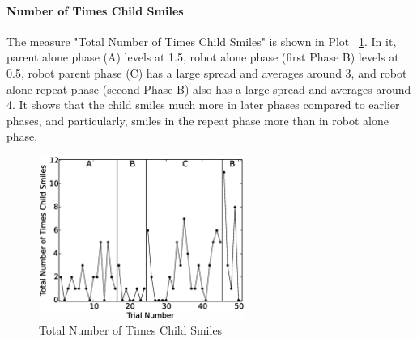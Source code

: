 \documentclass{ut-thesis}
\begin{document}
\paragraph{Number of Times Child Smiles}
The measure "Total Number of Times Child Smiles" is shown in Plot \ \ref{fig:12TotalNumberofTimesChildSmiles}.  In it, parent alone phase (A) levels at 1.5, robot alone phase (first Phase B) levels at 0.5, robot parent phase (C) has a large spread and averages around 3, and robot alone repeat phase (second Phase B) also has a large spread and averages around 4.  It shows that the child smiles much more in later phases compared to earlier phases, and particularly, smiles in the repeat phase more than in robot alone phase.
\begin{figure} [h]
	\centering
	\includegraphics[width=0.6\textwidth]{./img/data_analysis/12TotalNumberofTimesChildSmiles.eps}
	\caption{Total Number of Times Child Smiles}
	\label{fig:12TotalNumberofTimesChildSmiles}
\end{figure}
\end{document}
